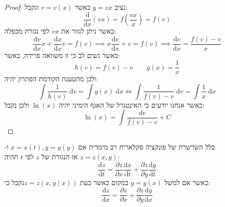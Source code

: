 \documentclass{tstextbook}
\begin{document}
\begin{proof}
נציב \(y=vx\) כאשר \(v=v(x)\) ונקבל:
$$\frac{\mathrm{d} }{\mathrm{d} x} (vx)=f\left( \frac{vx}{x} \right)=f(v)$$
כאשר ניתן לגזור את \(vx\) לפי נגזרת מכפלה:
$$\frac{\mathrm{d} v}{\mathrm{d} x} x+\frac{\mathrm{d} x}{\mathrm{d} x} v=f(v)\implies x\frac{\mathrm{d} v}{\mathrm{d} x}+v=f(v)\implies \frac{\mathrm{d} v}{\mathrm{d} x} =\frac{f(v)-v}{x} $$
כאשר נשים לב כי זו משוואה פרידה, כאשר:
$$h(v)=f(v)-v\qquad g(x)=\frac{1}{x}$$
ולכן מהטענה הקודמת הפתרון יהיה:
$$\int \frac{1}{h(v)} \;\mathrm{d} v=\int g(x)\;\mathrm{d}x \iff \int \frac{1}{f(v)-v} \;\mathrm{d} v = \int \frac{1}{x} \;\mathrm{d} x $$
כאשר אנחנו יודעים כי האינטגרל של האגף הימיני יהיה \(\ln(x)\) ולכן נקבל:
$$\ln(x)=\int{\frac{d v}{f(v)-v}} +C$$

\end{proof}
כלל השרשרת של פונקציה סקלארית רב מימדית
אם \(x=x(t),y=y(y)\) ו-\(z=z(x,y)\) אז הנגזרת של \(z\) לפי \(t\) תהיה:
$$\frac{\mathrm{d} z}{\mathrm{d} t} =\frac{\partial z}{\partial x} \frac{\mathrm{d} x}{\mathrm{d} t} +\frac{\partial z}{\partial y} \frac{\mathrm{d} y}{\mathrm{d} t} $$
כאשר אם למשל \(y=y(x)\) במקום כאשר כעת \(z=z(x,y(x))\)נקבל כי:
$$\frac{\mathrm{d} z}{\mathrm{d} x} =\frac{\partial z}{\partial x} +\frac{\partial z}{\partial y} \frac{\mathrm{d} y}{\mathrm{d} x} $$
\end{document}
